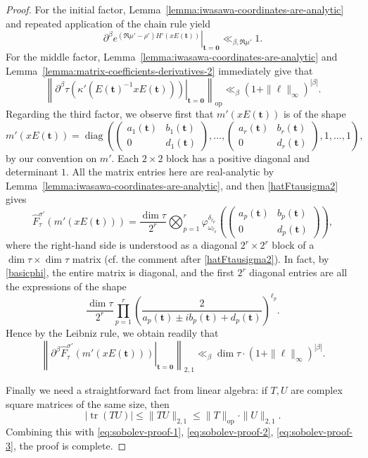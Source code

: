 \documentclass[11pt,oneside]{amsart}
\numberwithin{equation}{section}
\theoremstyle{remark}
\theoremstyle{plain}
\DeclareMathOperator{\diag}{diag}
\DeclareMathOperator{\tr}{tr}
\newcommand{\bt}{\mathbf{t}}
\renewcommand\leq{\leqslant}
\begin{document}
\begin{proof}
For the initial factor, Lemma~\ref{lemma:iwasawa-coordinates-are-analytic} and repeated application of the chain rule yield
\begin{equation}\label{eq:sobolev-proof-1}
\left. \partial^{\beta} e^{(\Re\mu' - \rho')H'(x E(\bt) )} \right|_{\bt=\mathbf{0}} \ll_{\beta,\Re\mu'} 1.
\end{equation}
For the middle factor, Lemma~\ref{lemma:iwasawa-coordinates-are-analytic} and Lemma~\ref{lemma:matrix-coefficients-derivatives-2} immediately give that
\begin{equation}\label{eq:sobolev-proof-2}
\left\| \left. \partial^{\beta} \tau(\kappa'(E(\bt)^{-1} x E(\bt))) \right|_{\bt=\mathbf{0}} \right\|_{\mathrm{op}} 
\ll_{\beta} (1+\|\bm\ell\|_\infty)^{|\beta|}.
\end{equation}
Regarding the third factor, we observe first that $m'(xE (\bt))$ is of the shape
\[
m'(x E(\bt)) = \diag\left( \begin{pmatrix} a_1(\bt) & b_1(\bt) \\ 0 & d_1(\bt) \end{pmatrix},\dotsc,\begin{pmatrix} a_r(\bt) & b_r(\bt) \\ 0 & d_r(\bt) \end{pmatrix},1,\dotsc,1 \right), 
\]
by our convention on $m'$. Each $2\times 2$ block has a positive diagonal and determinant $1$. All the matrix entries here are real-analytic by Lemma~\ref{lemma:iwasawa-coordinates-are-analytic}, and then \eqref{hatFtausigma2} gives
\[
\hat F_\tau^{\sigma'}(m'(xE(\bt))) = \frac{\dim \tau}{2^r} \bigotimes_{p=1}^r \varphi_{\omega_{\ell_p}}^{\delta_{\ell_p}} \left(\begin{pmatrix} a_p(\bt) & b_p(\bt) \\ 0 & d_p(\bt) \end{pmatrix}\right),
\]
where the right-hand side is understood as a diagonal $2^r\times 2^r$ block of a $\dim \tau \times \dim \tau$ matrix (cf. the comment after \eqref{hatFtausigma2}). In fact, by \eqref{basicphi}, the entire matrix is diagonal, and the first $2^r$ diagonal entries are all the expressions of the shape
$$ \frac{\dim \tau}{2^r} \prod_{p=1}^r \left( \frac{2}{a_p(\bt) \pm i b_p(\bt) + d_p(\bt)} \right)^{\ell_p}. $$
Hence by the Leibniz rule, we obtain readily that
\begin{equation}\label{eq:sobolev-proof-3}
\left\| \left. \partial^{\beta} \hat{F}_\tau^{\sigma'}(m'(x E(\bt))) \right|_{\bt=\mathbf{0}} \right\|_{2,1} \ll_{\beta} \dim\tau \cdot (1+\|\bm\ell\|_\infty)^{|\beta|}.
\end{equation}

Finally we need a straightforward fact from linear algebra: if $T,U$ are complex square matrices of the same size, then
\[
|\tr(TU)| \leq \|TU\|_{2,1} \leq \|T\|_{\mathrm{op}} \cdot \|U\|_{2,1}.
\]
Combining this with \eqref{eq:sobolev-proof-1}, \eqref{eq:sobolev-proof-2}, \eqref{eq:sobolev-proof-3}, the proof is complete.
\end{proof}
\end{document}
